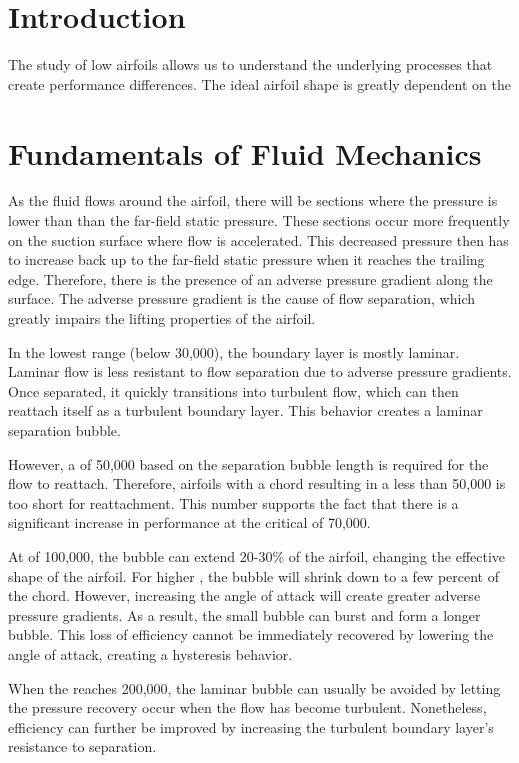 \documentclass[letterpaper,12pt,]{article}
\begin{document}
\section{Introduction}

The study of low \rn airfoils allows us to understand the underlying processes that create performance differences. The ideal airfoil shape is greatly dependent on the 

\section{Fundamentals of Fluid Mechanics}

As the fluid flows around the airfoil, there will be sections where the pressure is lower than than the far-field static pressure. These sections occur more frequently on the suction surface where flow is accelerated. This decreased pressure then has to increase back up to the far-field static pressure when it reaches the trailing edge. Therefore, there is the presence of an adverse pressure gradient along the surface. The adverse pressure gradient is the cause of flow separation, which greatly impairs the lifting properties of the airfoil.

In the lowest \rn range (below 30,000), the boundary layer is mostly laminar. Laminar flow is less resistant to flow separation due to adverse pressure gradients. Once separated, it quickly transitions into turbulent flow, which can then reattach itself as a turbulent boundary layer. This behavior creates a laminar separation bubble.

However, a \rn of 50,000 based on the separation bubble length is required for the flow to reattach. Therefore, airfoils with a chord resulting in a \rn less than 50,000 is too short for reattachment. This number supports the fact that there is a significant increase in performance at the critical \rn of 70,000.

At \rn of 100,000, the bubble can extend 20-30\% of the airfoil, changing the effective shape of the airfoil. For higher \rn, the bubble will shrink down to a few percent of the chord. However, increasing the angle of attack will create greater adverse pressure gradients. As a result, the small bubble can burst and form a longer bubble. This loss of efficiency cannot be immediately recovered by lowering the angle of attack, creating a hysteresis behavior.

When the \rn reaches 200,000, the laminar bubble can usually be avoided by letting the pressure recovery occur when the flow has become turbulent. Nonetheless, efficiency can further be improved by increasing the turbulent boundary layer's resistance to separation.
\end{document}

